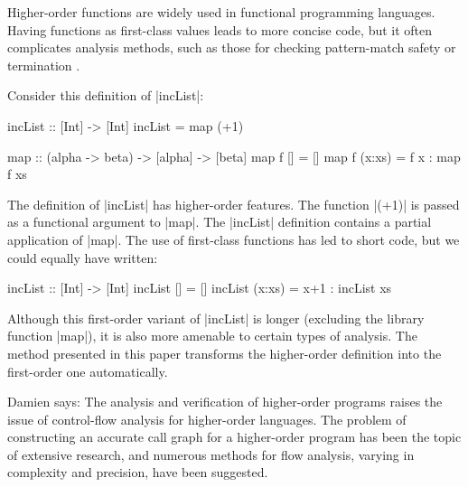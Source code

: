\documentclass[preprint]{sigplanconf}
\begin{document}





Higher-order functions are widely used in functional programming languages.  Having functions as first-class values leads to more concise code, but it often complicates analysis methods, such as those for checking pattern-match safety \cite{me:catch} or termination \cite{sereni:higher_order_termination}.

\begin{example}
\label{ex:incList}

Consider this definition of |incList|:

\begin{code}
incList :: [Int] -> [Int]
incList = map (+1)

map :: (alpha -> beta) -> [alpha] -> [beta]
map f []      = []
map f (x:xs)  = f x : map f xs
\end{code}

The definition of |incList| has higher-order features. The function |(+1)| is passed as a functional argument to |map|. The |incList| definition contains a partial application of |map|. The use of first-class functions has led to short code, but we could equally have written:

\begin{code}
incList :: [Int] -> [Int]
incList []      = []
incList (x:xs)  = x+1 : incList xs
\end{code}

Although this first-order variant of |incList| is longer (excluding the library function |map|), it is also more amenable to certain types of analysis. The method presented in this paper transforms the higher-order definition into the first-order one automatically.
\end{example}





Damien says: The analysis and verification of higher-order programs raises the issue of control-flow analysis for higher-order languages. The problem of constructing an accurate call graph for a higher-order program has been the topic of extensive research, and numerous methods for flow analysis, varying in complexity and precision, have been suggested.
\end{document}
